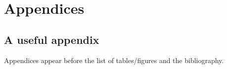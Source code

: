 \documentclass{gsemthesis}
\begin{document}
\part*{Appendices}
\appendix


\chapter{A useful appendix}

Appendices appear before the list of tables/figures and the bibliography. 



\printbackmatter
\end{document}
